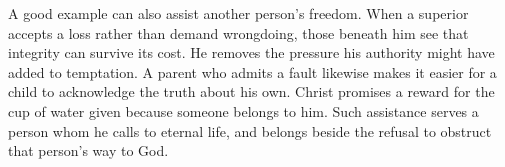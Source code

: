 A good example can also assist another person's freedom. When a superior accepts a loss rather than demand wrongdoing, those beneath him see that integrity can survive its cost. He removes the pressure his authority might have added to temptation. A parent who admits a fault likewise makes it easier for a child to acknowledge the truth about his own. Christ promises a reward for the cup of water given because someone belongs to him. Such assistance serves a person whom he calls to eternal life, and belongs beside the refusal to obstruct that person's way to God.


